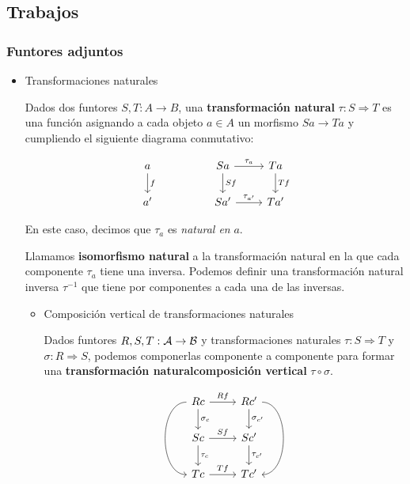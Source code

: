 \documentclass[11pt]{article}
\begin{document}
\subsection*{Trabajos}
\label{sec-7-5}
\subsubsection*{Funtores adjuntos}
\label{sec-7-5-1}
\begin{itemize}
\item Transformaciones naturales
\label{sec-7-5-1-1}
\begin{definition}
Dados dos funtores $S,T : A \to B$, una \textbf{transformación natural} $\tau : S \Longrightarrow T$ 
es una función asignando a cada objeto $a \in A$ un morfismo $Sa \to Ta$ y 
cumpliendo el siguiente diagrama conmutativo:

\[\begin{tikzcd}
a \dar{f} & & Sa \rar{\tau_a}\dar{Sf} & Ta \dar{Tf} \\
a' & & Sa' \rar{\tau_{a'}} & Ta'
\end{tikzcd}\]

En este caso, decimos que $\tau_a$ es \emph{natural en} $a$.
\end{definition}

\begin{definition}
Llamamos \textbf{isomorfismo natural} a la transformación natural en la que
cada componente $\tau_a$ tiene una inversa. Podemos definir una transformación
natural inversa $\tau^{-1}$ que tiene por componentes a cada una de las inversas.
\end{definition}

\begin{itemize}
\item Composición vertical de transformaciones naturales
\label{sec-7-5-1-1-1}
\begin{definition}
Dados funtores $R,S,T : {\cal A} \to {\cal B}$ y transformaciones naturales $\tau : S \Longrightarrow T$
y $\sigma : R \Longrightarrow S$, podemos componerlas componente a componente para formar
una \textbf{transformación naturalcomposición vertical} $\tau \circ \sigma$.

\[\begin{tikzcd}
Rc \rar{Rf}\dar{\sigma_c}\arrow[dd,bend right=90] &
Rc' \dar{\sigma_{c'}} \arrow[dd,bend left=90] \\
Sc \rar{Sf} \dar{\tau_c} & Sc' \dar{\tau_{c'}} \\
Tc \rar{Tf} & Tc' 
\end{tikzcd}
\]
\end{definition}


\end{itemize}
\end{itemize}
\end{document}
